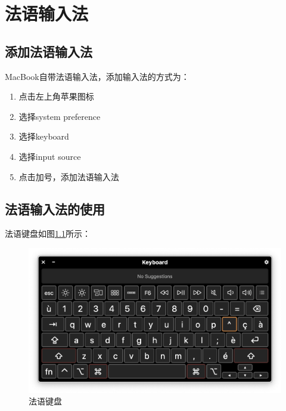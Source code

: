
\chapter{法语输入法}

\section{添加法语输入法}


MacBook自带法语输入法，添加输入法的方式为：
\begin{enumerate}
\item 点击左上角苹果图标
\item 选择system preference
\item 选择keyboard
\item 选择input source
\item 点击加号，添加法语输入法
\end{enumerate}

\section{法语输入法的使用}
法语键盘如图\ref{fig:french-input}所示：
\begin{figure}[!ht]
  \centering
  \includegraphics[width=\textwidth]{french-input.png}
  \caption{法语键盘}
  \label{fig:french-input}
\end{figure}



